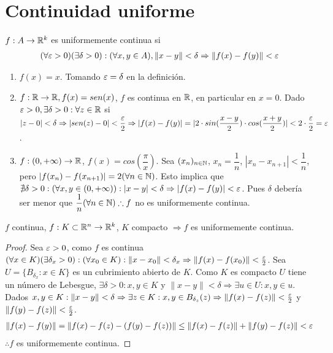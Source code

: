 \section{Continuidad uniforme}

\begin{definition}
  \(f: A \to \mathbb{R}^k\) es uniformemente continua si \begin{align*}
    (\forall \varepsilon > 0)(\exists \delta > 0) : (\forall x,y \in A), \|x-y\| < \delta \Rightarrow \|f(x) - f(y)\| < \varepsilon
  \end{align*}
\end{definition}

\begin{eg}
  \begin{enumerate}
    \item \(f(x) = x\). Tomando \(\varepsilon = \delta\) en la definición.
    \item \(f: \mathbb{R} \to \mathbb{R}, f(x) = sen(x)\), \(f\) es continua en \(\mathbb{R}\), en particular en \(x = 0\). Dado \(\varepsilon > 0, \exists \delta > 0 : \forall z \in \mathbb{R}\) si \(|z-0| < \delta \Rightarrow |sen(z) - 0| < \dfrac{\varepsilon}{2} \Rightarrow |f(x) - f(y)| = |2 \cdot sin(\dfrac{x-y}{2}) \cdot cos(\dfrac{x+y}{2})| < 2 \cdot \dfrac{\varepsilon}{2} = \varepsilon\).
    \item \(f: (0, +\infty) \to \mathbb{R}\), \(f(x) = cos(\dfrac{\pi}{x})\). Sea \((x_n)_{n \in \mathbb{N}}\), \(x_n = \dfrac{1}{n}\), \(|x_n - x_{n+1}| < \dfrac{1}{n}\), pero \(|f(x_n) - f(x_{n+1})| = 2 (\forall n \in \mathbb{N})\). Esto implica que \(\nexists \delta > 0 : (\forall x,y \in (0, +\infty)) : |x-y| < \delta \Rightarrow |f(x) - f(y)| < \varepsilon\). Pues \(\delta\) debería ser menor que \(\dfrac{1}{n} (\forall n \in \mathbb{N}) \therefore f\) no es uniformemente continua.
  \end{enumerate}
\end{eg}

\begin{theorem}
  \(f\) continua, \(f: K \subset \mathbb{R}^n \to \mathbb{R}^k\), \(K\) compacto \(\Rightarrow f\) es uniformemente continua.
  \begin{proof}
    Sea \(\varepsilon > 0\), como \(f\) es continua \((\forall x \in K)(\exists \delta_x > 0) : (\forall x_0 \in K) : \|x - x_0\| < \delta_x \Rightarrow \|f(x) - f(x_0)\| < \frac{\varepsilon}{2}\). Sea \(U = \{B_{\delta_x} : x \in K\}\) es un cubrimiento abierto de \(K\). Como \(K\) es compacto \(U\) tiene un número de Lebesgue, \(\exists \delta > 0 : x, y \in K\) y \(\|x-y\| < \delta \Rightarrow \exists u \in U : x, y \in u\). Dados \(x, y \in K : \|x-y\| < \delta \Rightarrow \exists z \in K : x, y \in B_{\delta_z}(z) \Rightarrow \|f(x) - f(z)\| < \frac{\varepsilon}{2}\) y \(\|f(y) - f(z)\| < \frac{\varepsilon}{2}\).
    \begin{align*}
      \|f(x) - f(y)\| = \|f(x) - f(z) - (f(y) - f(z))\| \leq \|f(x) - f(z)\| + \|f(y) - f(z)\| < \varepsilon
    \end{align*} \(\therefore f\) es uniformemente continua.
  \end{proof}
\end{theorem}


